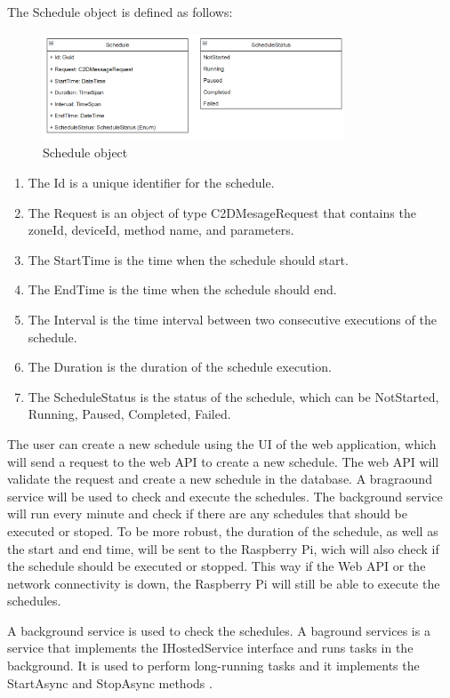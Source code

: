 The Schedule object is defined as follows:
\begin{figure}[H]
    \centering
    \includegraphics[width=0.8\textwidth]{images/schedule.png}
    \caption{Schedule object}
    \label{fig:schedule-object}
\end{figure}

\begin{enumerate}
    \item The Id is a unique identifier for the schedule.
    \item The Request is an object of type C2DMesageRequest that contains the zoneId, deviceId, method name, and parameters.
    \item The StartTime is the time when the schedule should start.
    \item The EndTime is the time when the schedule should end.
    \item The Interval is the time interval between two consecutive executions of the schedule.
    \item The Duration is the duration of the schedule execution.
    \item The ScheduleStatus is the status of the schedule, which can be NotStarted, Running, Paused, Completed, Failed.
\end{enumerate}

The user can create a new schedule using the UI of the web application,
which will send a request to the web API to create a new schedule. 
The web API will validate the request and create a new schedule in the database.
A bragraound service will be used to check and execute the schedules. The background service will run 
every minute and check if there are any schedules that should be executed or stoped. To be more robust, the duration 
of the schedule, as well as the start and end time, will be sent to the Raspberry Pi, wich will also check if 
the schedule should be executed or stopped. This way if the Web API or the network connectivity is down, 
the Raspberry Pi will still be able to execute the schedules.

A background service is used to check the schedules. A baground services is a service that implements
the IHostedService interface and runs tasks in the background. It is used to perform long-running tasks and
it implements the StartAsync and StopAsync methods \cite{IHostedService}.


